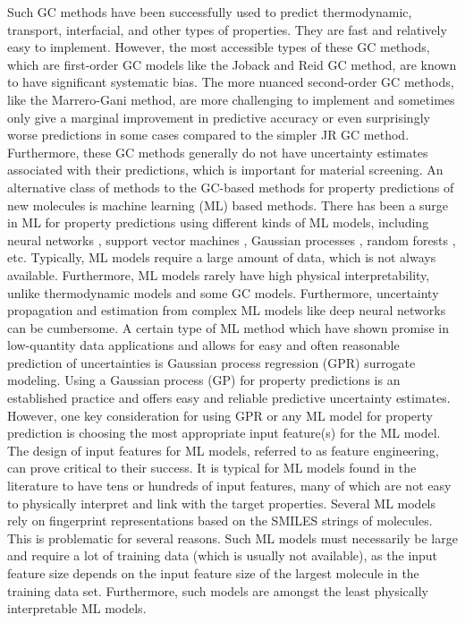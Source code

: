 \documentclass[journal=jacsat,manuscript=article]{achemso}
\begin{document}
Such GC methods have been successfully used to predict thermodynamic, transport, interfacial, and other types of properties. They are fast and relatively easy to implement. 
However, the most accessible types of these GC methods, which are first-order GC models like the Joback and Reid GC method, are known to have significant systematic bias. 
The more nuanced second-order GC methods, like the Marrero-Gani method, are more challenging to implement and sometimes only give a marginal improvement in predictive accuracy or even surprisingly worse predictions in some cases compared to the simpler JR GC method. 
Furthermore, these GC methods generally do not have uncertainty estimates associated with their predictions, which is important for material screening.
 An alternative class of methods to the GC-based methods for property predictions of new molecules is machine learning (ML) based methods. 
 There has been a surge in ML for property predictions using different kinds of ML models, including neural networks \cite{taskinenPredictionPhysicochemicalProperties2003}, support vector machines \cite{zhaoApplicationSupportVector2006, xueSupportVectorMachinesBased2004}, Gaussian processes \cite{obrezanovaGaussianProcessesMethod2007,
pustokhinaDevelopingRobustModel2021,
bishnoiScalableGaussianProcesses2021}, random forests \cite{palmerRandomForestModels2007}, etc. Typically, ML models require a large amount of data, which is not always available. 
 Furthermore, ML models rarely have high physical interpretability, unlike thermodynamic models and some GC models. 
 Furthermore, uncertainty propagation and estimation from complex ML models like deep neural networks can be cumbersome. 
 A certain type of ML method which have shown promise in low-quantity data applications and allows for easy and often reasonable prediction of uncertainties is Gaussian process regression (GPR) surrogate modeling. 
 Using a Gaussian process (GP) for property predictions is an established practice and offers easy and reliable predictive uncertainty estimates. However, one key consideration for using GPR or any ML model for property prediction is choosing the most appropriate input feature(s) for the ML model. The design of input features for ML models, referred to as feature engineering, can prove critical to their success. It is typical for ML models found in the literature to have tens or hundreds of input features, many of which are not easy to physically interpret and link with the target properties. Several ML models rely on fingerprint representations based on the SMILES strings of molecules. This is problematic for several reasons. Such ML models must necessarily be large and require a lot of training data (which is usually not available), as the input feature size depends on the input feature size of the largest molecule in the training data set. Furthermore, such models are amongst the least physically interpretable ML models. 
\end{document}
